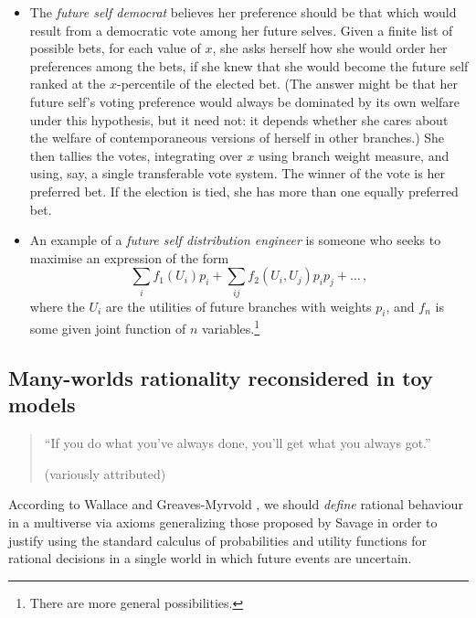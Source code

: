 \documentclass[aps,
pra,epsfig]{revtex4}
\begin{document}
\begin{itemize}
\item The {\it future self democrat} believes her preference should
be that which would result from a democratic vote among her future
selves.   Given a finite list of possible bets, for each value of 
$x$, she asks herself how she would order her preferences 
among the bets, if she knew that she would become the future self ranked at 
the $x$-percentile of the elected bet.  
(The answer might be that her future self's voting preference would always be 
dominated by its own welfare under this hypothesis, but it need not: 
it depends whether she cares about the welfare 
of contemporaneous versions of herself in other branches.) 
She then tallies the votes, integrating over $x$ using branch weight
measure, and using, say, a single transferable vote system.  
The winner of the vote
is her preferred bet.   If the election is tied, she has  
more than one equally preferred bet.   

\item An example of a {\it future self distribution engineer} 
is someone who seeks to maximise an expression of the form
\begin{equation}
\sum_i f_1 (U_i ) p_i + \sum_{ij} f_2 (U_i , U_j ) p_i p_j + \ldots \, , 
\end{equation}
where the $U_i$ are the utilities of future branches with weights $p_i$, 
and $f_n$ is some given joint function of $n$ 
variables.\footnote{There are more general possibilities.}

\end{itemize}

\subsection{Many-worlds rationality reconsidered in toy models} 

\begin{quotation}
``If you do what you've always done, you'll get what you always got.''

(variously attributed)
\end{quotation}



According to Wallace \cite{wallacevoltwo} and 
Greaves-Myrvold \cite{greavesmyrvoldvol}, we should 
{\it define} rational behaviour in a multiverse via axioms 
generalizing those proposed by Savage\cite{savage} in order
to justify using the standard calculus of probabilities and
utility functions for rational decisions in a single world
in which future events are uncertain.   
\end{document}
